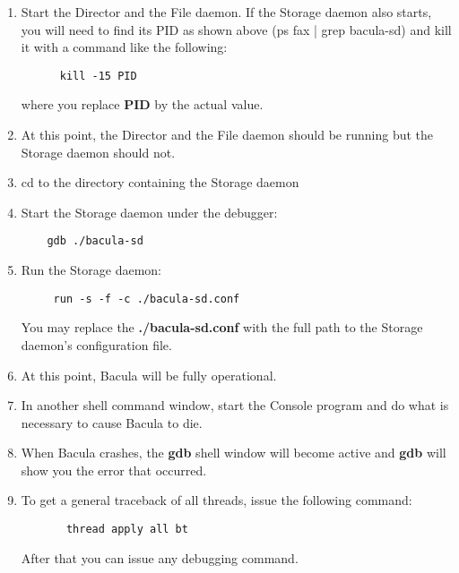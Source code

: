 \begin{enumerate}
\item Start the Director and the File daemon. If the  Storage daemon also
   starts, you will need to find its PID  as shown above (ps fax | grep
   bacula-sd) and kill it  with a command like the following:  

\footnotesize
\begin{verbatim}
      kill -15 PID
\end{verbatim}
\normalsize

where you replace {\bf PID} by the actual value. 

\item At this point, the Director and the File daemon should  be running but
   the Storage daemon should not.  

\item cd to the directory containing the Storage daemon  

\item Start the Storage daemon under the debugger:  

   \footnotesize
\begin{verbatim}
    gdb ./bacula-sd
\end{verbatim}
\normalsize

\item Run the Storage daemon:  

   \footnotesize
\begin{verbatim}
     run -s -f -c ./bacula-sd.conf
\end{verbatim}
\normalsize

You may replace the {\bf ./bacula-sd.conf} with the full path  to the Storage
daemon's configuration file.  

\item At this point, Bacula will be fully operational.  

\item In another shell command window, start the Console program  and do what
   is necessary to cause Bacula to die.  

\item When Bacula crashes, the {\bf gdb} shell window will  become active and
   {\bf gdb} will show you the error that  occurred.  

\item To get a general traceback of all threads, issue the following  command:
 

\footnotesize
\begin{verbatim}
       thread apply all bt
\end{verbatim}
\normalsize

After that you can issue any debugging command. 
\end{enumerate}

